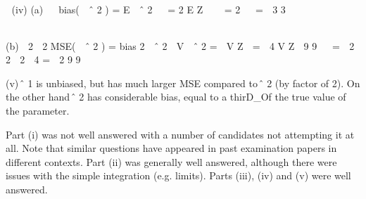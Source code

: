 \documentclass[a4paper,12pt]{article}
\begin{document}
\lambda 
(iv)
(a)


bias(  ˆ 2 ) = E  ˆ 2   = 2 E \lambda Z    = 2   = 
3
3
\lambda 
\newpage

\begin{table}[ht!]
 \centering
 \begin{tabular}{|p{15cm}|}
 \hline  
 
 \\ \hline
  \end{tabular}
\end{table}

(b)
 2
 2
MSE(  ˆ 2 ) = bias 2  ˆ 2  V  ˆ 2 =
 V  Z  =
 4 V \lambda Z 
9
9
\lambda  \lambda 
=
 2
2  2
 4
=  2
9
9

(v)
̂ 1 is unbiased, but has much larger MSE compared to ̂ 2 (by factor of 2). 
On the other hand ̂ 2 has considerable bias, equal to a thirD_{O}f the true value
of the parameter.

Part (i) was not well answered with a number of candidates not
attempting it at all. Note that similar questions have appeared in past
examination papers in different contexts. Part (ii) was generally well
answered, although there were issues with the simple integration (e.g.
limits). Parts (iii), (iv) and (v) were well answered.
\end{document}
